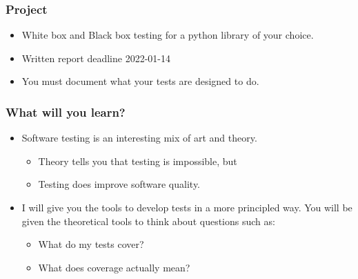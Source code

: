 \documentclass{beamer}
\begin{document}
\begin{frame}
  \frametitle{Project}
  \begin{itemize}
  \item White box and Black box testing for a python library of your choice.
  \item Written report deadline 2022-01-14
  \item You must document what your tests are designed to do.
  \end{itemize}
\end{frame}
%
\begin{frame}
  \frametitle{What will you learn?}
  \begin{itemize}
  \item Software testing is an interesting mix of art and theory.
    \begin{itemize}
    \item Theory tells you that testing is impossible, but
    \item Testing does improve software quality.
    \end{itemize}
  \item I will give you the tools to develop tests in a more
    principled way. You will be given the theoretical tools to think
    about questions such as:
    \begin{itemize}
    \item What do my tests cover?
    \item What does coverage actually mean? 
    \end{itemize}
  \end{itemize}
\end{frame}
\end{document}
